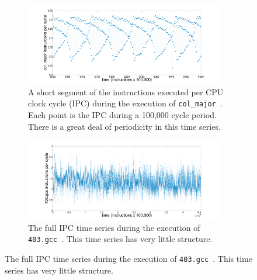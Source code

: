 \documentclass{article}
\newcommand{\gcc}{{\tt 403.gcc}~}
\newcommand{\col}{{\tt col\_major}~}
\begin{document}
\begin{figure}[htbp]
  \centering
  \begin{subfigure}[t]{0.475\textwidth}
    \includegraphics[width=0.95\textwidth]{figs/colshortts}
    \caption{A short segment of the instructions executed per CPU clock cycle
    (IPC) during the execution of \col. Each point is the IPC during a 100,000
    cycle period. There is a great deal of periodicity in this time series.}
    \label{fig:col-ts}
  \end{subfigure}%
  \begin{subfigure}[t]{0.475\textwidth}
    \includegraphics[width=0.95\textwidth]{figs/gccfullts}
    \caption{The full IPC time series during the execution of \gcc. This time
    series has very little structure.}
    \label{fig:gcc-ts}
  \end{subfigure}
  \label{fig:sample-ts}
\end{figure}
\end{document}
